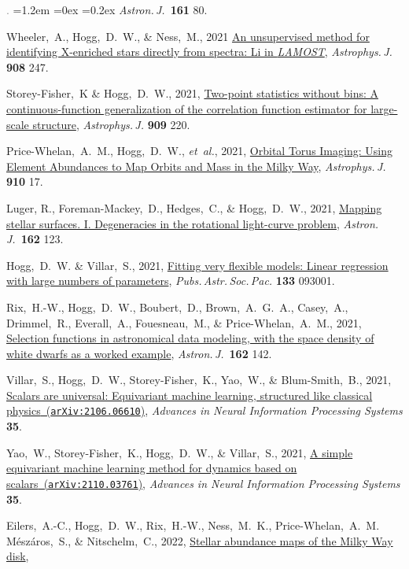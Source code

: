 \documentclass[10pt,letterpaper]{article}
\newcommand{\acronym}[1]{{\small{#1}}}
\newcommand{\foreign}[1]{\textsl{#1}}
\newcommand{\etal}{\foreign{et~al.}}
\newcommand{\project}[1]{\textsl{#1}}
\newcommand{\doi}[2]{\href{http://dx.doi.org/#1}{{#2}}}
\newcommand{\arxiv}[2]{\href{http://arxiv.org/abs/#1}{{#2}\ (\texttt{arXiv:#1})}}
\newcommand{\deemph}[1]{\textcolor{grey}{\footnotesize{#1}}}
\newcommand{\pubnumber}[1]{\deemph{{#1}.}}
\newcounter{refpubnum}
\newcommand{\hogglist}{%
    \rightmargin=0in
    \leftmargin=1.2em
    \topsep=0ex
    \partopsep=0pt
    \itemsep=0.2ex
    \parsep=0pt
    \itemindent=-1.0\leftmargin
    \listparindent=0.0\leftmargin
    \settowidth{\labelsep}{~}
    \usecounter{refpubnum}
  }
\begin{document}
\begin{list}{\pubnumber{\therefpubnum}}{\hogglist}
  \textit{Astron.\,J.}\ \textbf{161} 80.
\item
  Wheeler,~A., Hogg,~D.~W., \& Ness,~M., 2021
  \doi{10.3847/1538-4357/abd544}{An unsupervised method for identifying X-enriched stars directly from spectra: Li in \project{\acronym{LAMOST}}},
  \textit{Astrophys.\,J.} \textbf{908} 247.
\item
  Storey-Fisher,~K \& Hogg,~D.~W., 2021,
  \doi{10.3847/1538-4357/abdc21}{Two-point statistics without bins: A continuous-function generalization of the correlation function estimator for large-scale structure},
  \textit{Astrophys.\,J.} \textbf{909} 220.
\item
  Price-Whelan,~A.~M., Hogg,~D.~W., \etal, 2021,
  \doi{10.3847/1538-4357/abe1b7}{Orbital Torus Imaging: Using Element Abundances to Map Orbits and Mass in the Milky Way},
  \textit{Astrophys.\,J.} \textbf{910} 17.
\item
  Luger, R., Foreman-Mackey,~D., Hedges,~C., \& Hogg,~D.~W., 2021,
  \doi{10.3847/1538-3881/abfdb8}{Mapping stellar surfaces. I. Degeneracies in the rotational light-curve problem},
  \textit{Astron.\,J.}\ \textbf{162} 123.
\item
  Hogg,~D.~W. \& Villar,~S., 2021,
  \doi{10.1088/1538-3873/ac20ac}{Fitting very flexible models: Linear regression with large numbers of parameters},
  \textit{Pubs.\,Astr.\,Soc.\,Pac.} \textbf{133} 093001.
\item
  Rix,~H.-W., Hogg,~D.~W., Boubert,~D., Brown,~A.~G.~A., Casey,~A.,
  Drimmel,~R., Everall,~A., Fouesneau,~M., \& Price-Whelan,~A.~M., 2021,
  \doi{10.3847/1538-3881/ac0c13}{Selection functions in astronomical data modeling, with the space density of white dwarfs as a worked example},
  \textit{Astron.\,J.}\ \textbf{162} 142.
\item
  Villar,~S., Hogg,~D.~W., Storey-Fisher,~K., Yao,~W., \& Blum-Smith,~B., 2021,
  \arxiv{2106.06610}{Scalars are universal: Equivariant machine learning, structured like classical physics},
  \textit{Advances in Neural Information Processing Systems} \textbf{35}.
\item
  Yao,~W., Storey-Fisher,~K., Hogg,~D.~W., \& Villar,~S., 2021,
  \arxiv{2110.03761}{A simple equivariant machine learning method for dynamics based on scalars},
  \textit{Advances in Neural Information Processing Systems} \textbf{35}.
\item
  Eilers,~A.-C., Hogg,~D.~W., Rix,~H.-W., Ness,~M.~K., Price-Whelan,~A.~M. M\'esz\'aros,~S.,
  \& Nitschelm,~C., 2022,
  \doi{10.3847/1538-4357/ac54ad}{Stellar abundance maps of the Milky Way disk},

\end{list}
\end{document}
